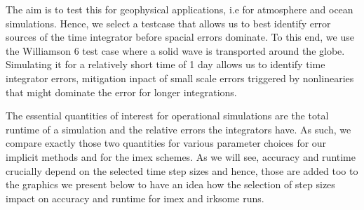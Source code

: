 \documentclass[a4paper, 12pt]{article}
\begin{document}
The aim is to test this for geophysical applications, i.e for atmosphere and ocean simulations. Hence, we select a testcase that allows us to best identify error sources of the time integrator before spacial errors dominate. To this end, we use the Williamson 6 test case where a solid wave is transported around the globe. Simulating it for a relatively short time of 1 day allows us to identify time integrator errors, mitigation inpact of small scale errors triggered by nonlinearies that might dominate the error for longer integrations.

The essential quantities of interest for operational simulations are the total runtime of a simulation and the relative errors the integrators have. As such, we compare exactly those two quantities for various parameter choices for our implicit methods and for the imex schemes. As we will see, accuracy and runtime crucially depend on the selected time step sizes and hence, those are added too to the graphics we present below to have an idea how the selection of step sizes impact on accuracy and runtime for imex and irksome runs.
\end{document}
